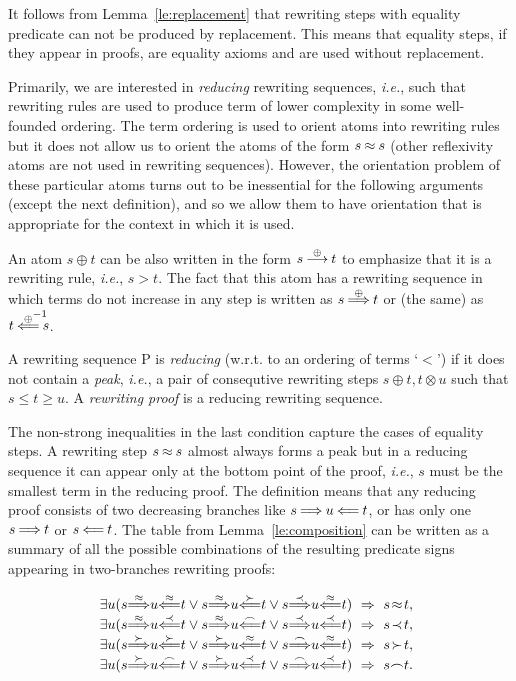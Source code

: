 It follows from Lemma~\ref{le:replacement} that rewriting steps with equality
predicate can not be produced by replacement. This means that equality
steps, if they appear in proofs, are equality axioms and are
 used without replacement.

Primarily, we are interested in {\em reducing} rewriting sequences, {\em i.e.},
such that rewriting rules are used to produce term of lower complexity in some
well-founded ordering.  The term ordering is used to orient atoms into
rewriting rules but it does not allow us to orient the atoms of the form $s\mathbin{\approx}
s$ (other reflexivity atoms are not used in rewriting sequences).  However, the
orientation problem of these particular atoms turns out to be inessential for
the following arguments (except the next definition), and so we allow them to
have orientation that is appropriate for the context in which it is used.

An atom \(s\oplus t\) can be also written in the form \(s\mathbin{\stackrel{\oplus}{\longrightarrow}} t\) to
emphasize that it is a rewriting rule, {\em i.e.}, $s>t$. The fact that this
atom has a rewriting sequence in which terms do not increase in any step is
written as \(s
\mathbin{\stackrel{\oplus}{\Longrightarrow}} t\) or (the same) as \(t \oTT{\oplus \rlap{${}^{-1}$}}s\). 
\begin{DEFINITION} \label{def:reducing-proof}
A rewriting sequence \C P is {\em reducing} (w.r.t. to an ordering of terms
`$<$') if it does not contain a {\em peak}, {\em i.e.}, a pair of consequtive
rewriting steps \(s\oplus t,t\otimes u\) such that \(s\leq t\geq u\).
A {\em rewriting proof} is a reducing rewriting sequence.
\end{DEFINITION}

The non-strong inequalities in the last condition capture the cases of
equality steps. A rewriting step \(s\mathbin{\approx} s\) almost always
forms a peak but in a reducing sequence it can appear only at
the bottom point of the proof, {\em i.e.}, $s$ must be the smallest term in the
reducing proof.  The definition means that any reducing proof consists of two
decreasing branches like \(s\mathbin{\stackrel{}{\Longrightarrow}}u\mathbin{\stackrel{}{\Longleftarrow}}t\), or has only one \(s\mathbin{\stackrel{}{\Longrightarrow}}t\) or
\(s\mathbin{\stackrel{}{\Longleftarrow}}t\). The table from Lemma~\ref{le:composition} can be written as a
summary of all the possible combinations of the resulting predicate signs
appearing in two-branches rewriting proofs:
\begin{CLAIM} \label{pr:reducing-proofs}
\[\begin{array}%
 {@{\exists u(s}c@{u}c@{t\lor s}c@{u}c@{t\lor s}c@{u}c@{t)\ \impl\ s}c@{t}c}
\TTo\Eq   & \oTT\Eq   & \TTo\Eq   & \oTT\Cont & \TTo\Incl & \oTT\Eq   & \Eq   &,\\
\TTo\Eq   & \oTT\Incl & \TTo\Eq   & \oTT\Int  & \TTo\Incl & \oTT\Incl & \Incl &,\\
\TTo\Cont & \oTT\Cont & \TTo\Cont & \oTT\Eq   & \TTo\Int  & \oTT\Eq   & \Cont &,\\
\TTo\Cont & \oTT\Int  & \TTo\Cont & \oTT\Incl & \TTo\Int  & \oTT\Incl & \Int  &.
\end{array}\]
\end{CLAIM}

